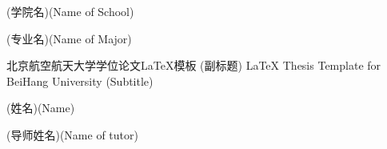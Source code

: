 
\school
{(学院名)}{(Name of School)}

\major
{(专业名)}{(Name of Major)}

\thesistitle
{北京航空航天大学学位论文\LaTeX{}模板}
{(副标题)}
{\LaTeX{} Thesis Template for BeiHang University}
{(Subtitle)}

\thesisauthor
{(姓名)}{(Name)}

\teacher
{(导师姓名)}{(Name of tutor)}






